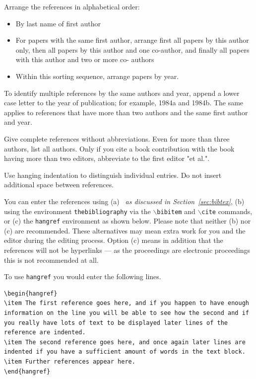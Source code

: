 \documentclass{wscpaperproc}
\theoremstyle{wsc}
\begin{document}
Arrange the references in alphabetical order: 
\begin{itemize}
	\item By last name of first author
	\item For papers with the same first author, arrange first all papers by this author only, 
    then all papers by this author and one co-author, and finally all papers with this author and two or more co- authors
\item Within this sorting sequence, arrange papers by year. 
\end{itemize}

To identify multiple references by the same authors and year, append a lower case letter to the year of publication; for example, 1984a and 1984b. The same applies to references that have more than two authors and the same first author and year. 

Give complete references without abbreviations. Even for more than three authors, list all authors. Only if you cite a book contribution with the book having more than two editors, abbreviate to the first editor "et al.".

Use hanging indentation to distinguish individual entries. Do not insert additional space between references.

You can enter the references using (a) {\em \BibTeX\ as discussed in Section~\ref{sec:bibtex}}, (b) using the environment {\tt thebibliography} via the {\tt $\backslash$bibitem} and {\tt $\backslash$cite} commands, or (c) the {\tt hangref} environment as shown below.
Please note that neither (b) nor (c) are recommended. These alternatives may mean extra work for you and the editor during the editing process. Option (c) means in addition that the references will not be hyperlinks --- as the proceedings are electronic proceedings this is not recommended at all.

To use {\tt hangref} you would enter the following lines.\newline


\begin{verbatim}
\begin{hangref}
\item The first reference goes here, and if you happen to have enough 
information on the line you will be able to see how the second and if
you really have lots of text to be displayed later lines of the
reference are indented.
\item The second reference goes here, and once again later lines are
indented if you have a sufficient amount of words in the text block.
\item Further references appear here.
\end{hangref}
\end{verbatim}\vspace{4mm}
\end{document}
